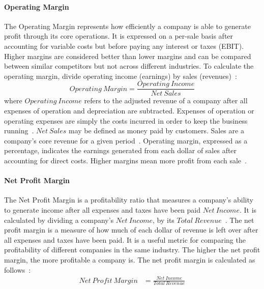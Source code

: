 \documentclass[../xlapes02]{subfiles}
\begin{document}
    \paragraph{Operating Margin}\label{par:operating-margin}
    The Operating Margin represents how efficiently a company is able to generate profit through its core operations. It is expressed on a per-sale basis after accounting for variable costs but before paying any interest or taxes (EBIT). Higher margins are considered better than lower margins and can be compared between similar competitors but not across different industries. To calculate the operating margin, divide operating income (earnings) by sales (revenues)~\cite{investopedia}:
    \begin{equation}
        Operating\ Margin=\frac{Operating\ Income}{Net\ Sales}
    \end{equation}
    where $Operating\ Income$ refers to the adjusted revenue of a company after all expenses of operation and depreciation are subtracted. Expenses of operation or operating expenses are simply the costs incurred in order to keep the business running~\cite{investopedia}. $Net\ Sales$ may be defined as money paid by customers. Sales are a company's core revenue for a given period~\cite{investopedia}. Operating margin, expressed as a percentage, indicates the earnings generated from each dollar of sales after accounting for direct costs. Higher margins mean more profit from each sale~\cite{investopedia}.

    \paragraph{Net Profit Margin}\label{par:net-profit-margin}
    The Net Profit Margin is a profitability ratio that measures a company's ability to generate income after all expenses and taxes have been paid $Net\ Income$. It is calculated by dividing a company's $Net\ Income$, by its $Total\ Revenue$~\cite{investopedia, investopedia}. The net profit margin is a measure of how much of each dollar of revenue is left over after all expenses and taxes have been paid. It is a useful metric for comparing the profitability of different companies in the same industry. The higher the net profit margin, the more profitable a company is. The net profit margin is calculated as follows~\cite{investopedia}:
    \begin{equation}
        \begin{split}
            Net\ Profit\ Margin&=\frac{Net\ Income}{Total\ Revenue}\\
        \end{split}
    \end{equation}
\end{document}
